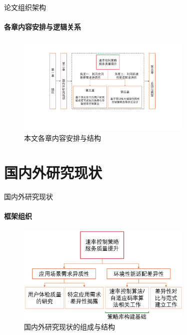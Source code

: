 \documentclass{beamer}
\begin{document}
\begin{frame}[fragile]{论文组织架构}
\framesubtitle{各章内容安排与逻辑关系}
    \begin{figure} [ht]
    \centering
    \includegraphics[width=0.75\textwidth]{figures/chap01/arrange.pdf} 
    \caption{本文各章内容安排与结构}
    \label{fig:arrange}
    \end{figure}

\end{frame}

\section{国内外研究现状}

\begin{frame}[fragile]{国内外研究现状}
\framesubtitle{框架组织}
    \begin{figure} [ht]
    \centering
    \includegraphics[width=0.75\textwidth]{figures/chap02/related.png} 
    \caption{国内外研究现状的组成与结构}
    \label{fig:arrange}
    \end{figure}
\end{frame}
\end{document}
